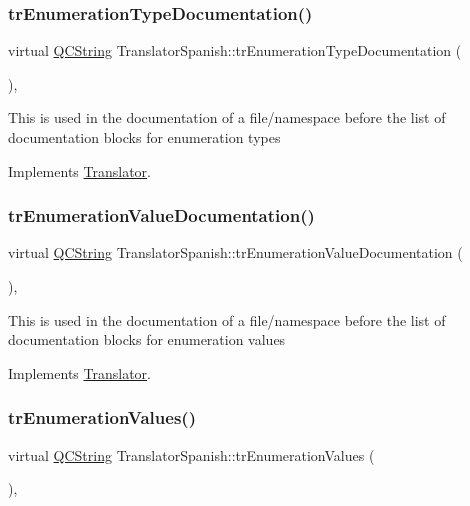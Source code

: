 \subsubsection{\texorpdfstring{trEnumerationTypeDocumentation()}{trEnumerationTypeDocumentation()}}
{\footnotesize\ttfamily virtual \mbox{\hyperlink{class_q_c_string}{Q\+C\+String}} Translator\+Spanish\+::tr\+Enumeration\+Type\+Documentation (\begin{DoxyParamCaption}{ }\end{DoxyParamCaption})\hspace{0.3cm}{\ttfamily [inline]}, {\ttfamily [virtual]}}

This is used in the documentation of a file/namespace before the list of documentation blocks for enumeration types 

Implements \mbox{\hyperlink{class_translator}{Translator}}.

\mbox{\label{class_translator_spanish_a7b70ba9cccbd2c205780946757462d11}} 
\subsubsection{\texorpdfstring{trEnumerationValueDocumentation()}{trEnumerationValueDocumentation()}}
{\footnotesize\ttfamily virtual \mbox{\hyperlink{class_q_c_string}{Q\+C\+String}} Translator\+Spanish\+::tr\+Enumeration\+Value\+Documentation (\begin{DoxyParamCaption}{ }\end{DoxyParamCaption})\hspace{0.3cm}{\ttfamily [inline]}, {\ttfamily [virtual]}}

This is used in the documentation of a file/namespace before the list of documentation blocks for enumeration values 

Implements \mbox{\hyperlink{class_translator}{Translator}}.

\mbox{\label{class_translator_spanish_abafb4634ff2c339b19d8e3292835ef95}} 
\subsubsection{\texorpdfstring{trEnumerationValues()}{trEnumerationValues()}}
{\footnotesize\ttfamily virtual \mbox{\hyperlink{class_q_c_string}{Q\+C\+String}} Translator\+Spanish\+::tr\+Enumeration\+Values (\begin{DoxyParamCaption}{ }\end{DoxyParamCaption})\hspace{0.3cm}{\ttfamily [inline]}, {\ttfamily [virtual]}}

